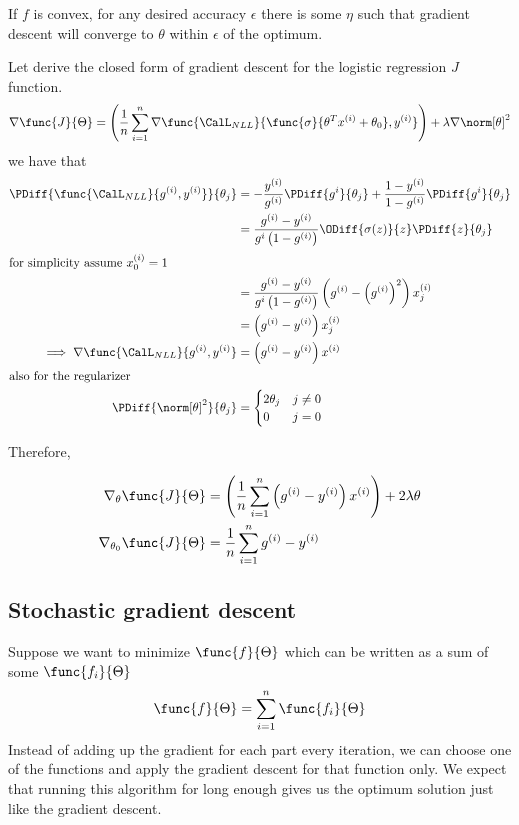 \begin{theorem}
    If \(f\) is convex, for any desired accuracy \(\epsilon\) there is some \(\eta\) such that gradient descent will converge to \(\theta\) within \(\epsilon\) of the optimum.
\end{theorem}

Let derive the closed form of gradient descent for the logistic regression \(J\) function. 
\begin{equation*}
    \nabla \func{J}{\Theta} = \left(\dfrac{1}{n} \sum_{i = 1}^n \nabla \func{\CalL_{NLL}}{ \func{\sigma}{\theta^T x^{(i)} + \theta_0} , y^{(i)}} \right) + \lambda \nabla \norm[\theta]^2
\end{equation*}
we have that 
\begin{align*}
    \PDiff{\func{\CalL_{NLL}}{g^{(i)} , y^{(i)}}}{\theta_j} &= - \dfrac{y^{(i)}}{g^{(i)}} \PDiff{g^{i}}{\theta_j} + \dfrac{1- y^{(i)}}{1 - g^{(i)}} \PDiff{g^{i}}{\theta_j}\\
    &= \dfrac{g^{(i)} - y^{(i)}}{g^{i} \left( 1 - g^{(i)} \right)} \ODiff{\sigma(z)}{z} \PDiff{z}{\theta_j} \\
    \intertext{for simplicity assume \(x^{(i)}_0 = 1\)}
    &= \dfrac{g^{(i)} - y^{(i)}}{g^{i} \left( 1 - g^{(i)} \right)} \left(g^{(i)} - \left(g^{(i)}\right)^2 \right) x^{(i)}_j\\
    &= \left(g^{(i)} - y^{(i)}\right) x^{(i)}_j \\
    \implies \nabla \func{\CalL_{NLL}}{g^{(i)} , y^{(i)}} &=\left(g^{(i)} - y^{(i)}\right) x^{(i)} \\
    \intertext{also for the regularizer}
    \PDiff{\norm[\theta]^2}{\theta_j} &= \begin{cases}
        2 \theta_j & j \neq 0\\
        0 & j = 0
    \end{cases}
\end{align*}

Therefore, 

\begin{align*}
    \nabla_{\theta} \func{J}{\Theta} &= \left(\dfrac{1}{n} \sum_{i = 1}^n \left(g^{(i)} - y^{(i)}\right) x^{(i)} \right) + 2\lambda \theta\\
    \nabla_{\theta_0} \func{J}{\Theta} &= \dfrac{1}{n} \sum_{i = 1}^n g^{(i)} - y^{(i)} 
\end{align*}

\subsection{Stochastic gradient descent}
Suppose we want to minimize \(\func{f}{\Theta}\) which can be written as a sum of some \(\func{f_i}{\Theta}\)
\begin{equation*}
    \func{f}{\Theta} = \sum_{i = 1}^n \func{f_i}{\Theta}
\end{equation*}
Instead of adding up the gradient for each part every iteration, we can choose one of the functions and apply the gradient descent for that function only. We expect that running this algorithm for long enough gives us the optimum solution just like the gradient descent.

